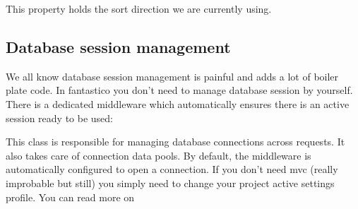 \documentclass[letterpaper,10pt,english]{sphinxmanual}
\begin{document}
\begin{fulllineitems}
\begin{fulllineitems}
\end{fulllineitems}


\begin{fulllineitems}
\label{features/mvc:fantastico.mvc.models.model_sort.ModelSort.sort_dir}
This property holds the sort direction we are currently using.

\end{fulllineitems}


\end{fulllineitems}



\subsection{Database session management}
\label{features/mvc:database-session-management}
We all know database session management is painful and adds a lot of boiler plate code. In fantastico you don't need
to manage database session by yourself. There is a dedicated middleware which automatically ensures there is an
active session ready to be used:

\begin{fulllineitems}
\label{features/mvc:fantastico.middleware.model_session_middleware.ModelSessionMiddleware}
This class is responsible for managing database connections across requests. It also takes care of
connection data pools. By default, the middleware is automatically configured to open a connection. If
you don't need mvc (really improbable but still) you simply need to change your project active settings
profile. You can read more on {\hyperref[get_started/settings:fantastico.settings.BasicSettings]{}}

\end{fulllineitems}
\end{document}
